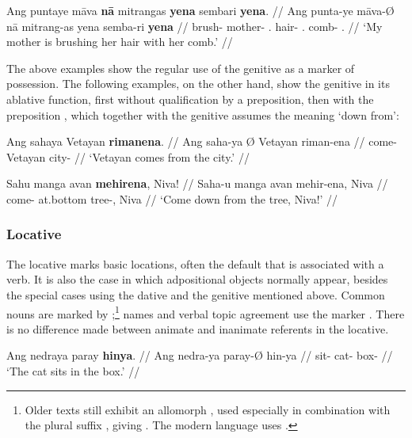 \ex\begingl
	\gla Ang puntaye māva \textbf{nā} mitrangas \textbf{yena} sembari 
		\textbf{yena}. //
	\glb Ang punta-ye māva-Ø nā mitrang-as yena semba-ri 
		\textbf{yena} //
	\glc \AgtT{} brush-\TsgF{} mother-\Top{} \Fsg{}.\Gen{} hair-\Parg{} 
		\TsgF{}.\Gen{} comb-\Ins{} \TsgF{}.\Gen{} //
	\glft `My mother is brushing her hair with her comb.' //
\endgl\xe

The above examples show the regular use of the genitive as a marker of 
possession. The following examples, on the other hand, show the genitive in its 
ablative function, first without qualification by a preposition, then with the 
preposition , which together with the 
genitive assumes the meaning `down from':

\pex
\a\begingl
	\gla Ang sahaya {} Vetayan \textbf{rimanena}. //
	\glb Ang saha-ya Ø Vetayan riman-ena //
	\glc \AgtT{} come-\TsgM{} \Top{} Vetayan city-\Gen{} //
	\glft `Vetayan comes from the city.' //
\endgl

\a\begingl
	\gla Sahu manga avan \textbf{mehirena}, Niva! //
	\glb Saha-u manga avan mehir-ena, Niva //
	\glc come-\Imp{} \Dyn{} at.bottom tree-\Gen{}, Niva //
	\glft `Come down from the tree, Niva!' //
\endgl

\xe


\subsubsection{Locative}

The locative marks basic locations, often the default that is associated with a 
verb. It is also the case in which adpositional objects normally appear, 
besides the special cases using the dative and the genitive mentioned above. 
Common nouns are marked by ;\footnote{Older texts still exhibit 
an allomorph , used especially in combination with the plural 
suffix , giving . The modern language uses 
.} names and verbal topic agreement use the marker 
. There is no difference made between animate and inanimate 
referents in the locative.

\pex\label{ex:locplain}
\a\label{ex:locnedra}\begingl
	\gla Ang nedraya paray \textbf{hinya}. //
	\glb Ang nedra-ya paray-Ø hin-ya //
	\glc \AgtT{} sit-\TsgM{} cat-\Top{} box-\Loc{} //
	\glft `The cat sits in the box.' //
\endgl

